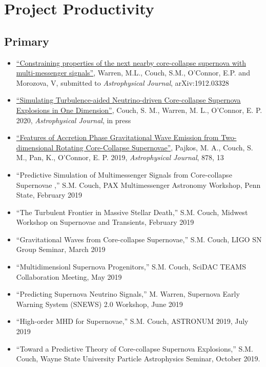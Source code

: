 \documentclass[12pt,titlepage]{article}
\begin{document}
\section{Project Productivity}

\subsection{Primary}

\begin{itemize}
    \item \href{https://ui.adsabs.harvard.edu/abs/2019arXiv191203328W}{``Constraining properties of the next nearby core-collapse supernova with multi-messenger signals''}, {Warren}, M.L., {Couch}, S.M., {O'Connor}, E.P. and {Morozova}, V, submitted to {\itshape Astrophysical Journal}, arXiv:1912.03328
    \item \href{https://ui.adsabs.harvard.edu/#abs/2019arXiv190201340C/abstract}{``Simulating Turbulence-aided Neutrino-driven Core-collapse Supernova Explosions in One Dimension''}, Couch, S. M., Warren, M. L., O'Connor, E. P. 2020, {\itshape Astrophysical Journal}, in press 
    \item \href{https://ui.adsabs.harvard.edu/#abs/2019arXiv190109055P/abstract}{``Features of Accretion Phase Gravitational Wave Emission from Two-dimensional Rotating Core-Collapse Supernovae''}, Pajkos, M. A., Couch, S. M., Pan, K., O'Connor, E. P. 2019, {\itshape Astrophysical Journal}, 878, 13
\end{itemize}


\begin{itemize}
    \item  ``Predictive Simulation of Multimessenger Signals from Core-collapse Supernovae ,'' S.M. Couch, PAX Multimessenger Astronomy Workshop, Penn State, February 2019
    \item ``The Turbulent Frontier in Massive Stellar Death,'' S.M. Couch, Midwest Workshop on Supernovae and Transients, February 2019
    \item ``Gravitational Waves from Core-collapse Supernovae,'' S.M. Couch, LIGO SN Group Seminar, March 2019
    \item ``Multidimensionl Supernova Progenitors,'' S.M. Couch, SciDAC TEAMS Collaboration Meeting, May 2019
    \item ``Predicting Supernova Neutrino Signals,'' M. Warren, Supernova Early Warning System (SNEWS) 2.0 Workshop, June 2019
    \item ``High-order MHD for Supernovae,'' S.M. Couch, ASTRONUM 2019, July 2019
    \item ``Toward a Predictive Theory of Core-collapse Supernova Explosions,'' S.M. Couch, Wayne State University Particle Astrophysics Seminar, October 2019.
\end{itemize}
\end{document}
